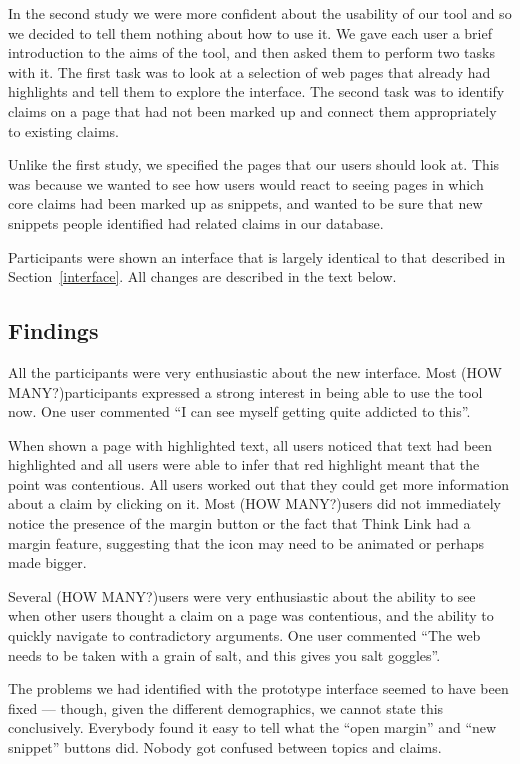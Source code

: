\documentclass{chi2009}
\newcommand{\howmany}{{\color{red} (HOW MANY?)}}
\begin{document}
In the second study we were more confident about the usability of our tool and so we decided to tell them nothing about how to use it. We gave each user a brief introduction to the aims of the tool, and then asked them to perform two tasks with it. The first task was to look at a selection of web pages that already had highlights and tell them to explore the interface. The second task was to identify claims on a page that had not been marked up and connect them appropriately to existing claims.

Unlike the first study, we specified the pages that our users should look at. This was because we wanted to see how users would react to seeing pages in which core claims had been marked up as snippets, and wanted to be sure that new snippets people identified had related claims in our database.

Participants were shown an interface that is largely identical to that described in Section~\ref{interface}. All changes are described in the text below.

\subsection{Findings}

All the participants were very enthusiastic about the new interface. Most \howmany participants expressed a strong interest in being able to use the tool now. One user commented ``I can see myself getting quite addicted to this''.

When shown a page with highlighted text, all users noticed that text had been highlighted and all users were able to infer that red highlight meant that the point was contentious. All users worked out that they could get more information about a claim by clicking on it. Most \howmany users did not immediately notice the presence of the margin button or the fact that Think Link had a margin feature, suggesting that the icon may need to be animated or perhaps made bigger.

Several \howmany users were very enthusiastic about the ability to see when other users thought a claim on a page was contentious, and the ability to quickly navigate to contradictory arguments. One user commented ``The web needs to be taken with a grain of salt, and this gives you salt goggles''.

The problems we had identified with the prototype interface seemed to have been fixed --- though, given the different demographics, we cannot state this conclusively. Everybody found it easy to tell what the ``open margin'' and ``new snippet'' buttons did. Nobody got confused between topics and claims. 
\end{document}
